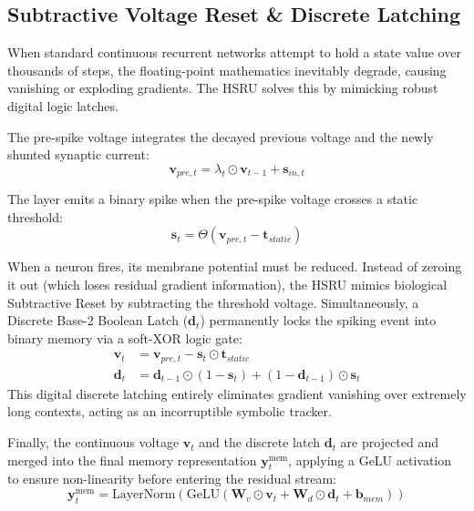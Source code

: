 \documentclass[11pt,a4paper]{article}
\begin{document}
\subsection{Subtractive Voltage Reset \& Discrete Latching}
When standard continuous recurrent networks attempt to hold a state value over thousands of steps, the floating-point mathematics inevitably degrade, causing vanishing or exploding gradients. The HSRU solves this by mimicking robust digital logic latches.

The pre-spike voltage integrates the decayed previous voltage and the newly shunted synaptic current:
\begin{equation}
    \mathbf{v}_{pre, t} = \lambda_t \odot \mathbf{v}_{t-1} + \mathbf{s}_{in, t}
\end{equation}

The layer emits a binary spike when the pre-spike voltage crosses a static threshold:
\begin{equation}
    \mathbf{s}_t = \Theta(\mathbf{v}_{pre, t} - \mathbf{t}_{static})
\end{equation}

When a neuron fires, its membrane potential must be reduced. Instead of zeroing it out (which loses residual gradient information), the HSRU mimics biological Subtractive Reset by subtracting the threshold voltage. Simultaneously, a Discrete Base-2 Boolean Latch ($\mathbf{d}_t$) permanently locks the spiking event into binary memory via a soft-XOR logic gate:
\begin{align}
    \mathbf{v}_t &= \mathbf{v}_{pre, t} - \mathbf{s}_t \odot \mathbf{t}_{static} \\
    \mathbf{d}_t &= \mathbf{d}_{t-1} \odot (1 - \mathbf{s}_t) + (1 - \mathbf{d}_{t-1}) \odot \mathbf{s}_t
\end{align}
This digital discrete latching entirely eliminates gradient vanishing over extremely long contexts, acting as an incorruptible symbolic tracker.

Finally, the continuous voltage $\mathbf{v}_t$ and the discrete latch $\mathbf{d}_t$ are projected and merged into the final memory representation $\mathbf{y}_t^{\text{mem}}$, applying a GeLU activation to ensure non-linearity before entering the residual stream:
\begin{equation}
    \mathbf{y}_t^{\text{mem}} = \text{LayerNorm}\left( \text{GeLU}\left( \mathbf{W}_v \odot \mathbf{v}_t + \mathbf{W}_d \odot \mathbf{d}_t + \mathbf{b}_{mem} \right) \right)
\end{equation}
\end{document}
